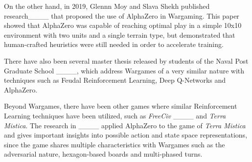 On the other hand, in 2019, Glennn Moy and Slava Shekh published  research____ that proposed the use of AlphaZero in Wargaming. This paper showed that AlphaZero was capable of reaching optimal play in a simple 10x10 environment with two units and a single terrain type, but demonstrated that human-crafted heuristics were still needed in order to accelerate training.

There have also been several master thesis released by students of the Naval Post Graduate School ____, which address Wargames of a very similar nature with techniques such as Feudal Reinforcement Learning, Deep Q-Networks and AlphaZero.

Beyond Wargames, there have been other games where similar Reinforcement Learning techniques have been utilized, such as \textit{FreeCiv} ____ and \textit{Terra Mistica}. The research in ____ applied AlphaZero to the game of \textit{Terra Mistica} and gives important insights into possible action and state space representations, since the game shares multiple characteristics with Wargames such as the adversarial nature, hexagon-based boards and multi-phased turns.


